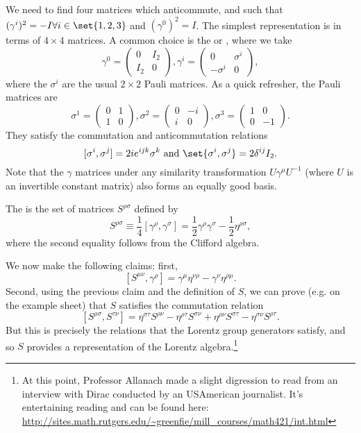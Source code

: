 We need to find four matrices which anticommute, and such that $(\gamma^i)^2=-I \forall i\in \set{1,2,3}$ and $(\gamma^0)^2=I$. The simplest representation is in terms of $4\times 4$ matrices. A common choice is the  or , where we take
$$\gamma^0=\begin{pmatrix}
0&I_2\\
I_2 & 0
\end{pmatrix},
\gamma^i=\begin{pmatrix}
0&\sigma^i\\
-\sigma^i&0
\end{pmatrix},$$
where the $\sigma^i$ are the usual $2\times 2$ Pauli matrices. As a quick refresher, the Pauli matrices are
$$\sigma^1=\begin{pmatrix}
0&1\\1&0
\end{pmatrix},
\sigma^2=\begin{pmatrix}
0&-i\\i&0
\end{pmatrix},
\sigma^3=\begin{pmatrix}
1&0\\0&-1
\end{pmatrix}.$$
They satisfy the commutation and anticommutation relations
$$[\sigma^i,\sigma^j]=2i e^{ijk}\sigma^k\text{ and }\set{\sigma^i,\sigma^j}=2\delta^{ij}I_2.$$
Note that the $\gamma$ matrices under any similarity transformation $U\gamma^\mu U^{-1}$ (where $U$ is an invertible constant matrix) also forms an equally good basis.

\begin{defn}
    The  is the set of matrices $S^{\rho\sigma}$ defined by
    \begin{equation}
        S^{\rho\sigma}\equiv \frac{1}{4}[\gamma^\rho,\gamma^\sigma]=\frac{1}{2}\gamma^\rho \gamma^\sigma -\frac{1}{2} \eta^{\rho\sigma},
    \end{equation}
    where the second equality follows from the Clifford algebra.
\end{defn}
We now make the following claims: first,
$$[S^{\mu\nu},\gamma^\rho]=\gamma^\mu \eta^{\nu\rho}-\gamma^\nu \eta^{\rho\mu}.$$
Second, using the previous claim and the definition of $S$, we can prove (e.g. on the example sheet) that $S$ satisfies the commutation relation
$$[S^{\rho\sigma},S^{\tau\nu}]=\eta^{\sigma\tau}S^{\rho\nu}-\eta^{\rho\tau}S^{\sigma\nu}+\eta^{\rho\nu}S^{\sigma\tau}-\eta^{\sigma\nu}S^{\rho\tau}.$$
But this is precisely the relations that the Lorentz group generators satisfy, and so $S$ provides a representation of the Lorentz algebra.\footnote{At this point, Professor Allanach made a slight digression to read from an interview with Dirac conducted by an USAmerican journalist. It's entertaining reading and can be found here: \url{http://sites.math.rutgers.edu/~greenfie/mill_courses/math421/int.html}}

